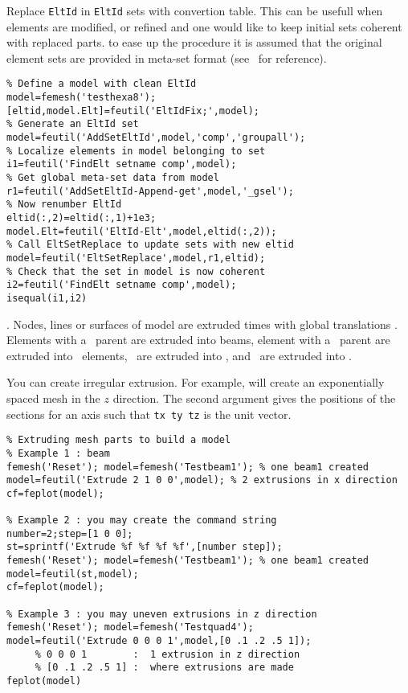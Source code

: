 
Replace {\tt EltId} in {\tt EltId} sets with convertion table. This can be usefull when elements are modified, or refined and one would like to keep initial sets coherent with replaced parts. to ease up the procedure it is assumed that the original element sets are provided in meta-set format (see~ for reference).

\begin{verbatim}
% Define a model with clean EltId
model=femesh('testhexa8');
[eltid,model.Elt]=feutil('EltIdFix;',model);
% Generate an EltId set
model=feutil('AddSetEltId',model,'comp','groupall');
% Localize elements in model belonging to set
i1=feutil('FindElt setname comp',model);
% Get global meta-set data from model
r1=feutil('AddSetEltId-Append-get',model,'_gsel');
% Now renumber EltId
eltid(:,2)=eltid(:,1)+1e3;
model.Elt=feutil('EltId-Elt',model,eltid(:,2));
% Call EltSetReplace to update sets with new eltid
model=feutil('EltSetReplace',model,r1,eltid);
% Check that the set in model is now coherent
i2=feutil('FindElt setname comp',model);
isequal(i1,i2)
\end{verbatim}%



.  Nodes, lines or surfaces of model are extruded  times with global translations .  Elements with a \mass\ parent are extruded into beams, element with a \beam\ parent are extruded into \quada\ elements, \quada\ are extruded into \hexah, and \quadb\ are extruded into \hexav.

You can create irregular extrusion. For example,  will create an exponentially spaced mesh in the $z$ direction. The second argument gives the positions of the sections for an axis such that {\tt tx ty tz} is the unit vector.

\begin{verbatim}
% Extruding mesh parts to build a model
% Example 1 : beam
femesh('Reset'); model=femesh('Testbeam1'); % one beam1 created
model=feutil('Extrude 2 1 0 0',model); % 2 extrusions in x direction
cf=feplot(model);

% Example 2 : you may create the command string
number=2;step=[1 0 0];
st=sprintf('Extrude %f %f %f %f',[number step]);
femesh('Reset'); model=femesh('Testbeam1'); % one beam1 created
model=feutil(st,model);
cf=feplot(model);

% Example 3 : you may uneven extrusions in z direction
femesh('Reset'); model=femesh('Testquad4');
model=feutil('Extrude 0 0 0 1',model,[0 .1 .2 .5 1]);
     % 0 0 0 1        :  1 extrusion in z direction
     % [0 .1 .2 .5 1] :  where extrusions are made
feplot(model)
\end{verbatim}%


